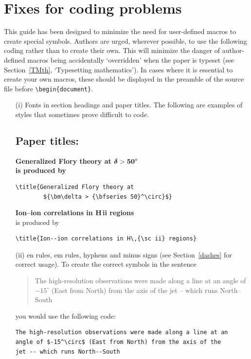 \documentclass{tBPS2e}
\theoremstyle{plain}
\theoremstyle{definition}
\theoremstyle{remark}
\begin{document}
\section{Fixes for coding problems}

This guide has been designed to minimize the need for user-defined macros to create special symbols. Authors
are urged, wherever possible, to use the following coding rather than to create their own. This will minimize
the danger of author-defined macros being accidentally `overridden' when the paper is typeset (see
Section~\ref{TMth}, `Typesetting mathematics'). In cases where it is essential to create your own macros,
these should be displayed in the preamble of the source file before \verb"\begin{document}".
%
\begin{enumerate}
\item[(i)] Fonts in section headings and paper titles. The following are examples
of styles that sometimes prove difficult to code.

\subsection*{Paper titles:}

\bf{\noindent Generalized Flory theory at ${\bm\delta >
{\bf 50}^\circ}$}\\

    \noindent\normalfont is produced by
\begin{verbatim}
\title{Generalized Flory theory at
        ${\bm\delta > {\bfseries 50}^\circ}$}
\end{verbatim}
\bigskip

{\bf{\noindent Ion--ion correlations in H\,{\sc ii} regions}}\\

\noindent\normalfont is produced by
\begin{verbatim}
\title{Ion--ion correlations in H\,{\sc ii} regions}
\end{verbatim}



\item[(ii)] en rules, em rules, hyphens and minus signs (see Section~\ref{dashes} for
correct usage). To create the correct symbols in the sentence
\begin{quote}
The high-resolution observations were made along a line at an
angle of $-15^\circ$ (East from North) from the axis of the
jet -- which runs North--South
\end{quote}
you would use the following code:
\begin{verbatim}
The high-resolution observations were made along a line at an
angle of $-15^\circ$ (East from North) from the axis of the
jet -- which runs North--South
\end{verbatim}


\end{enumerate}
\end{document}
